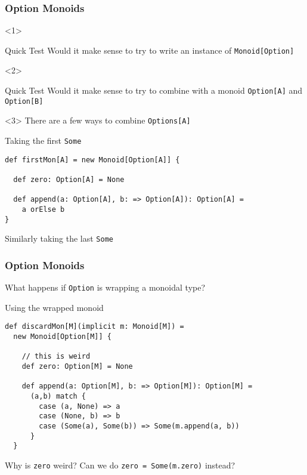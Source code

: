 \documentclass{beamer}
\begin{document}
\begin{frame}[fragile]
  \frametitle{Option Monoids}
  \begin{onlyenv}<1>
  \begin{block}{Quick Test}
    Would it make sense to try to write an instance of
    \texttt{Monoid[Option]}
  \end{block}
  \end{onlyenv}

  \begin{onlyenv}<2>
  \begin{block}{Quick Test}
    Would it make sense to try to combine with a monoid
    \texttt{Option[A]} and  \texttt{Option[B]}
  \end{block}
  \end{onlyenv}

  \begin{onlyenv}<3>
    There are a few ways to combine \texttt{Options[A]}

  \begin{block}{Taking the first \texttt{Some}}
  \begin{lstlisting}
def firstMon[A] = new Monoid[Option[A]] {

  def zero: Option[A] = None

  def append(a: Option[A], b: => Option[A]): Option[A] =
    a orElse b
}
  \end{lstlisting}
  \end{block}

  Similarly taking the last \texttt{Some}
  \end{onlyenv}

\end{frame}


\begin{frame}[fragile]
  \frametitle{Option Monoids}

  What happens if \texttt{Option} is wrapping a monoidal type?

  \begin{block}{Using the wrapped monoid}
  \begin{lstlisting}
def discardMon[M](implicit m: Monoid[M]) =
  new Monoid[Option[M]] {

    // this is weird
    def zero: Option[M] = None

    def append(a: Option[M], b: => Option[M]): Option[M] =
      (a,b) match {
        case (a, None) => a
        case (None, b) => b
        case (Some(a), Some(b)) => Some(m.append(a, b))
      }
  }
  \end{lstlisting}
  \end{block}

  Why is \texttt{zero} weird?
  \pause
  Can we do \texttt{zero = Some(m.zero)} instead?
\end{frame}
\end{document}

